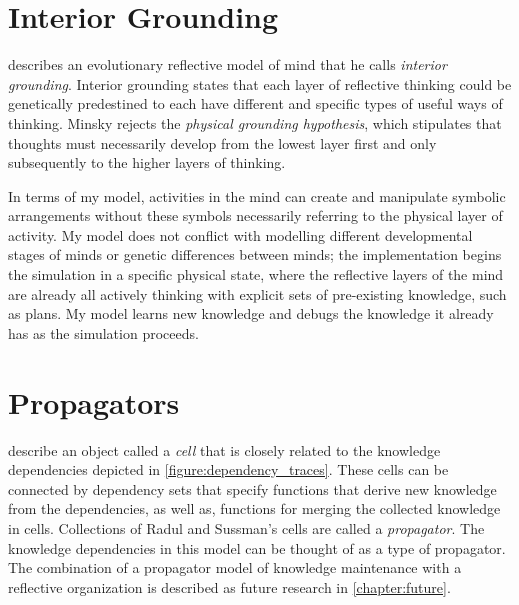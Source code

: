 \section{Interior Grounding}

\cite{minsky:2005} describes an evolutionary reflective model of mind
that he calls \emph{interior grounding}.  Interior grounding states
that each layer of reflective thinking could be genetically
predestined to each have different and specific types of useful ways
of thinking.  Minsky rejects the \emph{physical grounding hypothesis},
which stipulates that thoughts must necessarily develop from the
lowest layer first and only subsequently to the higher layers of
thinking.

In terms of my model, activities in the mind can create and manipulate
symbolic arrangements without these symbols necessarily referring to
the physical layer of activity.  My model does not conflict with
modelling different developmental stages of minds or genetic
differences between minds; the implementation begins the simulation in
a specific physical state, where the reflective layers of the mind are
already all actively thinking with explicit sets of pre-existing
knowledge, such as plans.  My model learns new knowledge and debugs
the knowledge it already has as the simulation proceeds.

\section{Propagators}

\cite{radul_and_sussman:2009} describe an object called a \emph{cell}
that is closely related to the knowledge dependencies depicted in
{\mbox{\autoref{figure:dependency_traces}}}.  These cells can be
connected by dependency sets that specify functions that derive new
knowledge from the dependencies, as well as, functions for merging the
collected knowledge in cells.  Collections of Radul and Sussman's
cells are called a \emph{propagator}.  The knowledge dependencies in
this model can be thought of as a type of propagator.  The combination
of a propagator model of knowledge maintenance with a reflective
organization is described as future research in
\autoref{chapter:future}.
